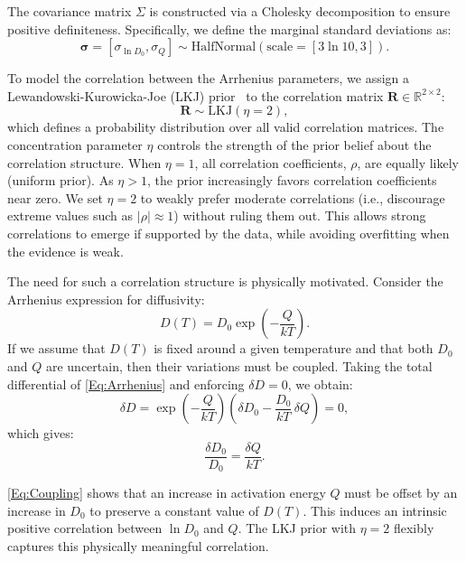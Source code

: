 \documentclass[%
preprint,
amsmath,amssymb,
aps,
]{revtex4-2}
\newcommand{\?}{\stackrel{?}{=}}
\begin{document}
The covariance matrix $\Sigma$ is constructed via a Cholesky decomposition \cite{McClarren2018} to ensure positive definiteness. Specifically, we define the marginal standard deviations as:
\begin{equation}
\boldsymbol{\sigma} = [\sigma_{\ln D_0}, \sigma_Q] \sim \mathrm{HalfNormal}(\text{scale} = [3 \ln 10, 3]).
\end{equation}

To model the correlation between the Arrhenius parameters, we assign a Lewandowski-Kurowicka-Joe (LKJ) prior~\cite{LKJ} to the correlation matrix $\mathbf{R} \in \mathbb{R}^{2\times2}$:
\begin{equation}
\textbf{R} \sim \mathrm{LKJ}(\eta = 2),
\end{equation}
which defines a probability distribution over all valid correlation matrices. The concentration parameter $\eta$ controls the strength of the prior belief about the correlation structure. When $\eta = 1$, all correlation coefficients, $\rho$, are equally likely (uniform prior). As $\eta > 1$, the prior increasingly favors correlation coefficients near zero. We set $\eta = 2$ to weakly prefer moderate correlations (i.e., discourage extreme values such as $|\rho| \approx 1$) without ruling them out. This allows strong correlations to emerge if supported by the data, while avoiding overfitting when the evidence is weak.

The need for such a correlation structure is physically motivated. Consider the Arrhenius expression for diffusivity:
\begin{equation}
D(T) = D_0 \exp\left(-\frac{Q}{kT}\right).
\label{Eq:Arrhenius}
\end{equation}
If we assume that $D(T)$ is fixed around a given temperature and that both $D_0$ and $Q$ are uncertain, then their variations must be coupled. Taking the total differential of \cref{Eq:Arrhenius} and enforcing $\delta D = 0$, we obtain:
\begin{equation}
\delta D = \exp\left(-\frac{Q}{kT}\right) \left( \delta D_0 - \frac{D_0}{kT} \, \delta Q \right) = 0,
\end{equation}
which gives:
\begin{equation}
\frac{\delta D_0}{D_0} = \frac{\delta Q}{kT}.
\label{Eq:Coupling}
\end{equation}

\cref{Eq:Coupling} shows that an increase in activation energy $Q$ must be offset by an increase in $D_0$ to preserve a constant value of $D(T)$. This induces an intrinsic positive correlation between $\ln D_0$ and $Q$. The LKJ prior with $\eta = 2$ flexibly captures this physically meaningful correlation.
\end{document}
